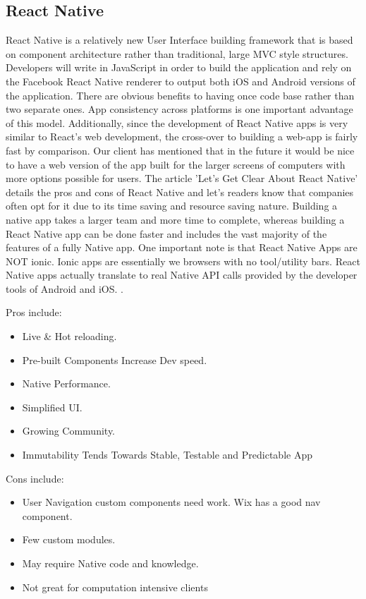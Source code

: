 \documentclass[titlepage,onecolumn]{article}
\begin{document}
\subsection{React Native}
React Native is a relatively new User Interface building framework that is based on component architecture rather than traditional, large MVC style structures. Developers will write in JavaScript in order to build the application and rely on the Facebook React Native renderer to output both iOS and Android versions of the application. There are obvious benefits to having once code base rather than two separate ones. App consistency across platforms is one important advantage of this model. Additionally, since the development of React Native apps is very similar to React's web development, the cross-over to building a web-app is fairly fast by comparison. Our client has mentioned that in the future it would be nice to have a web version of the app built for the larger screens of computers with more options possible for users. The article 'Let's Get Clear About React Native' details the pros and cons of React Native and let's readers know that companies often opt for it due to its time saving and resource saving nature. Building a native app takes a larger team and more time to complete, whereas building a React Native app can be done faster and includes the vast majority of the features of a fully Native app. One important note is that React Native Apps are NOT ionic. Ionic apps are essentially we browsers with no tool/utility bars. React Native apps actually translate to real Native API calls provided by the developer tools of Android and iOS. \cite{simplytechnologies}. 


Pros include:
\begin{itemize}
    \item Live \& Hot reloading.
    \item Pre-built Components Increase Dev speed.
    \item Native Performance.
    \item Simplified UI.
    \item Growing Community.
    \item Immutability Tends Towards Stable, Testable and Predictable App
\end{itemize}

Cons include:
\begin{itemize}
    \item User Navigation custom components need work. Wix has a good nav component.
    \item Few custom modules.
    \item May require Native code and knowledge.
    \item Not great for computation intensive clients
\end{itemize}
\end{document}
